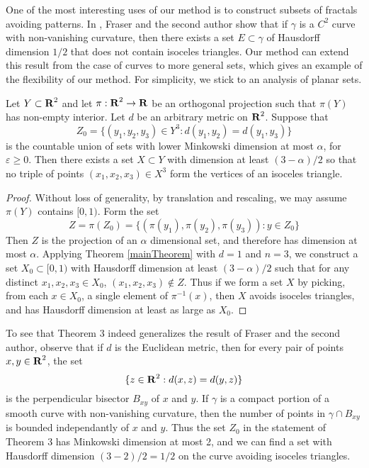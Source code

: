 One of the most interesting uses of our method is to construct subsets of fractals avoiding patterns. In \cite{MalabikaRob}, Fraser and the second author show that if $\gamma$ is a $C^2$ curve with non-vanishing curvature, then there exists a set $E \subset \gamma$ of Hausdorff dimension $1/2$ that does not contain isoceles triangles. Our method can extend this result from the case of curves to more general sets, which gives an example of the flexibility of our method. For simplicity, we stick to an analysis of planar sets.

\begin{theorem}
	Let $Y \subset \operatorname{\mathbf{R}}^2$ and let $\pi: \operatorname{\mathbf{R}}^2 \to \operatorname{\mathbf{R}}$ be an orthogonal projection such that $\pi(Y)$ has non-empty interior. Let $d$ be an arbitrary metric on $\operatorname{\mathbf{R}}^2$. Suppose that
	\[ Z_0 = \{ (y_1, y_2, y_3) \in Y^3: d(y_1,y_2) = d(y_1,y_3) \} \]
	is the countable union of sets with lower Minkowski dimension at most $\alpha$, for $\varepsilon \geq 0$. Then there exists a set $X \subset Y$ with dimension at least $(3 - \alpha)/2$ so that no triple of points $(x_1, x_2, x_3) \in X^3$ form the vertices of an isoceles triangle.
\end{theorem}
\begin{proof}
	Without loss of generality, by translation and rescaling, we may assume $\pi(Y)$ contains $[0,1)$. Form the set
	\[ Z = \pi(Z_0) = \{ (\pi(y_1), \pi(y_2), \pi(y_3)) : y \in Z_0 \} \]
	Then $Z$ is the projection of an $\alpha$ dimensional set, and therefore has dimension at most $\alpha$. Applying Theorem \ref{mainTheorem} with $d = 1$ and $n = 3$, we construct a set $X_0 \subset [0,1)$ with Hausdorff dimension at least $(3 - \alpha)/2$ such that for any distinct $x_1,x_2,x_3 \in X_0$, $(x_1,x_2,x_3) \not \in Z$. Thus if we form a set $X$ by picking, from each $x \in X_0$, a single element of $\pi^{-1}(x)$, then $X$ avoids isoceles triangles, and has Hausdorff dimension at least as large as $X_0$.
\end{proof}

To see that Theorem 3 indeed generalizes the result of Fraser and the second author, observe that if $d$ is the Euclidean metric, then for every pair of points $x,y \in \operatorname{\mathbf{R}}^2$, the set
%
\[ \{ z \in \operatorname{\mathbf{R}}^2: d(x,z) = d(y,z) \} \]
%
is the perpendicular bisector $B_{xy}$ of $x$ and $y$. If $\gamma$ is a compact portion of a smooth curve with non-vanishing curvature, then the number of points in $\gamma \cap B_{xy}$ is bounded independantly of $x$ and $y$. Thus the set $Z_0$ in the statement of Theorem 3 has Minkowski dimension at most 2, and we can find a set with Hausdorff dimension $(3 - 2)/2 = 1/2$ on the curve avoiding isoceles triangles.

